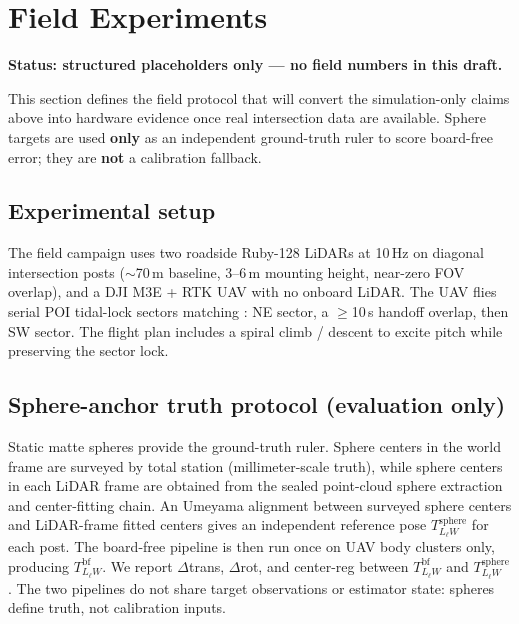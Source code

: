 \section{Field Experiments}
\label{sec:field}

\textbf{Status: structured placeholders only --- no field numbers in this draft.}

This section defines the field protocol that will convert the simulation-only claims
above into hardware evidence once real intersection data are available.
Sphere targets are used \textbf{only} as an independent ground-truth ruler to score
board-free error; they are \textbf{not} a calibration fallback.

\subsection{Experimental setup}
The field campaign uses two roadside Ruby-128 LiDARs at 10\,Hz on diagonal
intersection posts ($\sim$70\,m baseline, 3--6\,m mounting height, near-zero FOV
overlap), and a DJI M3E + RTK UAV with no onboard LiDAR.
The UAV flies serial POI tidal-lock sectors matching \flightW{}: NE sector, a
$\geq$10\,s handoff overlap, then SW sector.
The flight plan includes a spiral climb / descent to excite pitch while preserving
the sector lock.

\subsection{Sphere-anchor truth protocol (evaluation only)}
Static matte spheres provide the ground-truth ruler.
Sphere centers in the world frame are surveyed by total station (millimeter-scale
truth), while sphere centers in each LiDAR frame are obtained from the sealed
point-cloud sphere extraction and center-fitting chain.
An Umeyama alignment between surveyed sphere centers and LiDAR-frame fitted centers
gives an independent reference pose $T_{L_\ell W}^{\mathrm{sphere}}$ for each post.
The board-free pipeline is then run once on UAV body clusters only, producing
$T_{L_\ell W}^{\mathrm{bf}}$.
We report $\Delta$trans, $\Delta$rot, and center-reg between
$T_{L_\ell W}^{\mathrm{bf}}$ and $T_{L_\ell W}^{\mathrm{sphere}}$.
The two pipelines do not share target observations or estimator state: spheres define
truth, not calibration inputs.

